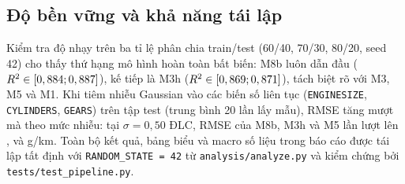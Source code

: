 \subsection{Độ bền vững và khả năng tái lập}
Kiểm tra độ nhạy trên ba tỉ lệ phân chia train/test (60/40, 70/30, 80/20, seed 42) cho thấy thứ hạng mô hình hoàn toàn bất biến: M8b luôn dẫn đầu ($R^2 \in [0,884; 0,887]$), kế tiếp là M3h ($R^2 \in [0,869; 0,871]$), tách biệt rõ với M3, M5 và M1. Khi tiêm nhiễu Gaussian vào các biến số liên tục (\texttt{ENGINESIZE}, \texttt{CYLINDERS}, \texttt{GEARS}) trên tập test (trung bình 20 lần lấy mẫu), RMSE tăng mượt mà theo mức nhiễu: tại $\sigma = 0{,}50$ ĐLC, RMSE của M8b, M3h và M5 lần lượt lên \noiseEightBHalf{}, \noiseThreeHHalf{} và \noiseFiveHalf{} g/km. Toàn bộ kết quả, bảng biểu và \nMacros{} macro số liệu trong báo cáo được tái lập tất định với \texttt{RANDOM\_STATE = 42} từ \texttt{analysis/analyze.py} và kiểm chứng bởi \texttt{tests/test\_pipeline.py}.
